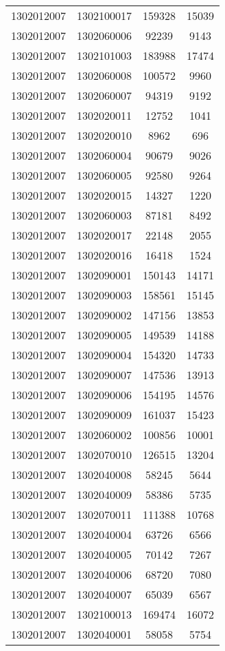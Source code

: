 \begin{longtable}{llcc}
1302012007 & 1302100017 & 159328 & 15039\\
1302012007 & 1302060006 & 92239 & 9143\\
1302012007 & 1302101003 & 183988 & 17474\\
1302012007 & 1302060008 & 100572 & 9960\\
1302012007 & 1302060007 & 94319 & 9192\\
1302012007 & 1302020011 & 12752 & 1041\\
1302012007 & 1302020010 & 8962 & 696\\
1302012007 & 1302060004 & 90679 & 9026\\
1302012007 & 1302060005 & 92580 & 9264\\
1302012007 & 1302020015 & 14327 & 1220\\
1302012007 & 1302060003 & 87181 & 8492\\
1302012007 & 1302020017 & 22148 & 2055\\
1302012007 & 1302020016 & 16418 & 1524\\
1302012007 & 1302090001 & 150143 & 14171\\
1302012007 & 1302090003 & 158561 & 15145\\
1302012007 & 1302090002 & 147156 & 13853\\
1302012007 & 1302090005 & 149539 & 14188\\
1302012007 & 1302090004 & 154320 & 14733\\
1302012007 & 1302090007 & 147536 & 13913\\
1302012007 & 1302090006 & 154195 & 14576\\
1302012007 & 1302090009 & 161037 & 15423\\
1302012007 & 1302060002 & 100856 & 10001\\
1302012007 & 1302070010 & 126515 & 13204\\
1302012007 & 1302040008 & 58245 & 5644\\
1302012007 & 1302040009 & 58386 & 5735\\
1302012007 & 1302070011 & 111388 & 10768\\
1302012007 & 1302040004 & 63726 & 6566\\
1302012007 & 1302040005 & 70142 & 7267\\
1302012007 & 1302040006 & 68720 & 7080\\
1302012007 & 1302040007 & 65039 & 6567\\
1302012007 & 1302100013 & 169474 & 16072\\
1302012007 & 1302040001 & 58058 & 5754\\

\end{longtable}
